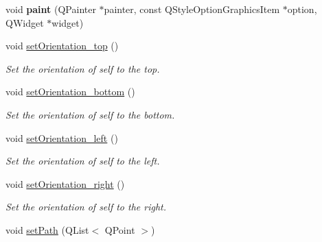 \begin{DoxyCompactItemize}
\item 
\hypertarget{class_ennemi_afbdea6c2e62c2065694a32db0f049325}{}void {\bfseries paint} (Q\+Painter $\ast$painter, const Q\+Style\+Option\+Graphics\+Item $\ast$option, Q\+Widget $\ast$widget)\label{class_ennemi_afbdea6c2e62c2065694a32db0f049325}

\item 
\hypertarget{class_ennemi_a7c509f048996eecb4ee768a044825d15}{}void \hyperlink{class_ennemi_a7c509f048996eecb4ee768a044825d15}{set\+Orientation\+\_\+top} ()\label{class_ennemi_a7c509f048996eecb4ee768a044825d15}

\begin{DoxyCompactList}\small\item\em Set the orientation of self to the top. \end{DoxyCompactList}\item 
\hypertarget{class_ennemi_ab3bbc6381307320c22b1686c5bc59d93}{}void \hyperlink{class_ennemi_ab3bbc6381307320c22b1686c5bc59d93}{set\+Orientation\+\_\+bottom} ()\label{class_ennemi_ab3bbc6381307320c22b1686c5bc59d93}

\begin{DoxyCompactList}\small\item\em Set the orientation of self to the bottom. \end{DoxyCompactList}\item 
\hypertarget{class_ennemi_ac455b7c41a46dc42a27841b9c566e329}{}void \hyperlink{class_ennemi_ac455b7c41a46dc42a27841b9c566e329}{set\+Orientation\+\_\+left} ()\label{class_ennemi_ac455b7c41a46dc42a27841b9c566e329}

\begin{DoxyCompactList}\small\item\em Set the orientation of self to the left. \end{DoxyCompactList}\item 
\hypertarget{class_ennemi_a4e99225c7a632efceebba66996d7d9ee}{}void \hyperlink{class_ennemi_a4e99225c7a632efceebba66996d7d9ee}{set\+Orientation\+\_\+right} ()\label{class_ennemi_a4e99225c7a632efceebba66996d7d9ee}

\begin{DoxyCompactList}\small\item\em Set the orientation of self to the right. \end{DoxyCompactList}\item 
\hypertarget{class_ennemi_a482e9c5ccc0cf1c3aa4e83f32f3eedb1}{}void \hyperlink{class_ennemi_a482e9c5ccc0cf1c3aa4e83f32f3eedb1}{set\+Path} (Q\+List$<$ Q\+Point $>$)\label{class_ennemi_a482e9c5ccc0cf1c3aa4e83f32f3eedb1}


\end{DoxyCompactItemize}

